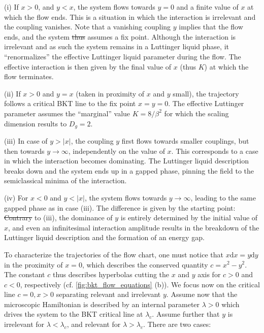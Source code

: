 \documentclass{svmono}
\def\rd{\mathrm d}
\providecommand{\DIFaddtex}[1]{{\protect\color{blue}\uwave{#1}}} %
\providecommand{\DIFdeltex}[1]{{\protect\color{red}\sout{#1}}}                      %
\providecommand{\DIFaddbegin}{} %
\providecommand{\DIFaddend}{} %
\providecommand{\DIFdelbegin}{} %
\providecommand{\DIFdelend}{} %
\providecommand{\DIFadd}[1]{\texorpdfstring{\DIFaddtex{#1}}{#1}} %
\providecommand{\DIFdel}[1]{\texorpdfstring{\DIFdeltex{#1}}{}} %
\newcommand{\DIFscaledelfig}{0.5}
\newlength{\DIFdelgraphicswidth} %
\newlength{\DIFdelgraphicsheight} %
\newcommand{\DIFaddincludegraphics}[2][]{{\color{blue}\fbox{\DIFOincludegraphics[#1]{#2}}}} %
\newcommand{\DIFdelincludegraphics}[2][]{%
\sbox{\DIFdelgraphicsbox}{\DIFOincludegraphics[#1]{#2}}%
\settoboxwidth{\DIFdelgraphicswidth}{\DIFdelgraphicsbox} %
\settoboxtotalheight{\DIFdelgraphicsheight}{\DIFdelgraphicsbox} %
\scalebox{\DIFscaledelfig}{%
\parbox[b]{\DIFdelgraphicswidth}{\usebox{\DIFdelgraphicsbox}\\[-\baselineskip] \rule{\DIFdelgraphicswidth}{0em}}\llap{\resizebox{\DIFdelgraphicswidth}{\DIFdelgraphicsheight}{%
\setlength{\unitlength}{\DIFdelgraphicswidth}%
\begin{picture}(1,1)%
\thicklines\linethickness{2pt} %
{\color[rgb]{1,0,0}\put(0,0){\framebox(1,1){}}}%
{\color[rgb]{1,0,0}\put(0,0){\line( 1,1){1}}}%
{\color[rgb]{1,0,0}\put(0,1){\line(1,-1){1}}}%
\end{picture}%
}\hspace*{3pt}}} %
} %
\DeclareRobustCommand{\DIFaddbegin}{\DIFOaddbegin \let\includegraphics\DIFaddincludegraphics} %
\DeclareRobustCommand{\DIFaddend}{\DIFOaddend \let\includegraphics\DIFOincludegraphics} %
\DeclareRobustCommand{\DIFdelbegin}{\DIFOdelbegin \let\includegraphics\DIFdelincludegraphics} %
\DeclareRobustCommand{\DIFdelend}{\DIFOaddend \let\includegraphics\DIFOincludegraphics} %
\begin{document}
(i) If $x>0$, and $y<x$, the system flows towards $y=0$ and a finite value of $x$ at which the flow ends.
This is a situation in which the interaction is irrelevant and the coupling vanishes.
Note that a vanishing coupling $y$ implies that the flow ends, and the system \DIFdelbegin \DIFdel{thus }\DIFdelend assumes a fix point.
Although the interaction is irrelevant and as such the system remains in a Luttinger liquid phase, it ``renormalizes'' the effective Luttinger liquid parameter during the flow.
The effective interaction is then given by the final value of $x$ (thus $K$) at which the flow terminates.

(ii) If $x>0$ and $y=x$ (taken in proximity of $x$ and $y$ small), the trajectory follows a critical BKT line to the fix point $x=y=0$.
The effective Luttinger parameter assumes the ``marginal'' value $K=8/\beta^2$ for which the scaling dimension results to $D_g=2$.

(iii) In case of $y>|x|$, the coupling $y$ first flows towards smaller couplings, but then towards $y\rightarrow\infty$, independently on the value of $x$.
This corresponds to a case in which the interaction becomes dominating.
The Luttinger liquid description breaks down and the system ends up in a gapped phase, pinning the field to the semiclassical minima of the interaction.

(iv) For $x<0$ and $y<|x|$, the system flows towards $y\rightarrow\infty$, leading to the same gapped phase as in case (iii).
The difference is given by the starting point: \DIFdelbegin \DIFdel{Contrary }\DIFdelend \DIFaddbegin \DIFadd{contrary }\DIFaddend to (iii), the dominance of $y$ is entirely determined by the initial value of $x$, and even an infinitesimal interaction amplitude results in the breakdown of the Luttinger liquid description and the formation of an energy gap.

To characterize the trajectories of the flow chart, one must notice that $x\rd x = y\rd y$ in the proximity of $x=0$, which describes the conserved quantity $c = x^2-y^2$.
The constant $c$ thus describes hyperbolas cutting the $x$ and $y$ axis for $c>0$ and $c<0$, respectively (cf. \cref{fig:bkt_flow_equations} (b)).
We focus now on the critical line $c=0, x>0$ separating relevant and irrelevant $y$.
Assume now that the microscopic Hamiltonian is described by an internal parameter $\lambda>0$ which drives the system to the BKT critical line at $\lambda_c$.
Assume further that $y$ is irrelevant for $\lambda<\lambda_c$, and relevant for $\lambda>\lambda_c$.
There are two cases:
\end{document}
